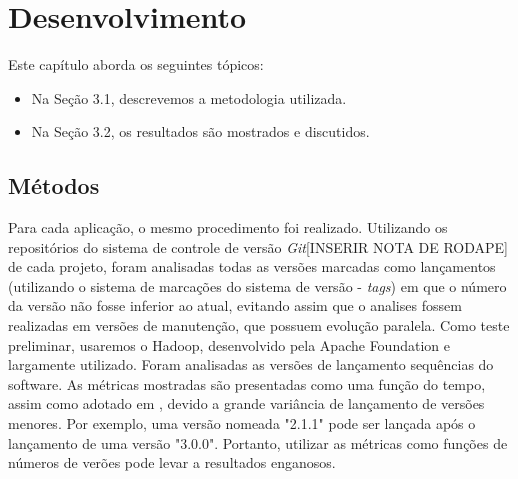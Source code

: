 \chapter{Desenvolvimento}
\label{chapter:desenvolvimento}

Este capítulo aborda os seguintes tópicos:
\begin{itemize}
\item Na Seção 3.1, descrevemos a metodologia utilizada.
\item Na Seção 3.2, os resultados são mostrados e discutidos.
\end{itemize}

\section{Métodos}

Para cada aplicação, o mesmo procedimento foi realizado. Utilizando os repositórios do sistema de controle de versão \textit{Git}[INSERIR NOTA DE RODAPE] de cada projeto, foram analisadas todas as versões marcadas como lançamentos (utilizando o sistema de marcações do sistema de versão - \textit{tags}) em que o número da versão não fosse inferior ao atual, evitando assim que o analises fossem realizadas em versões de manutenção, que possuem evolução paralela.
Como teste preliminar, usaremos o Hadoop, desenvolvido pela Apache Foundation e largamente utilizado. Foram analisadas as versões de lançamento sequências do software. As métricas mostradas são presentadas como uma função do tempo, assim como adotado em \cite{israeli2010linux}, devido a grande variância de lançamento de versões menores. Por exemplo, uma versão nomeada "2.1.1" pode ser lançada após o lançamento de uma versão "3.0.0". Portanto, utilizar as métricas como funções de números de verões pode levar a resultados enganosos.


